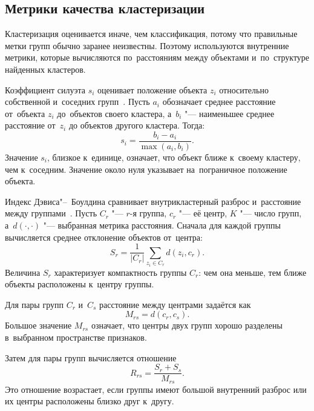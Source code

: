 \subsection{Метрики качества кластеризации}\label{subsec:ch1/cluster/metrics}

Кластеризация оценивается иначе, чем классификация, потому что правильные метки
групп обычно заранее неизвестны. Поэтому используются внутренние метрики,
которые вычисляются по~расстояниям между объектами и~по~структуре найденных
кластеров.

Коэффициент силуэта \( s_i \) оценивает положение объекта \( z_i \) относительно
собственной и~соседних групп~\autocite{Rousseeuw1987Silhouette}. Пусть
\( a_i \) обозначает среднее расстояние от~объекта \( z_i \) до~объектов своего
кластера, а~\( b_i \) "--- наименьшее среднее расстояние от~\( z_i \) до
объектов другого кластера. Тогда:
\begin{equation}
    \label{eq:silhouette}
    s_i = \frac{b_i - a_i}{\max(a_i,b_i)}.
\end{equation}
Значение \( s_i \), близкое к~единице, означает, что объект ближе к~своему
кластеру, чем к~соседним. Значение около нуля указывает на~пограничное
положение объекта.

Индекс Дэвиса"--~Боулдина сравнивает внутрикластерный разброс и~расстояние между
группами~\autocite{Davies1979DBI}. Пусть \( C_r \) "--- \( r \)-я группа,
\( c_r \) "--- её центр, \( K \) "--- число групп, а~\( d(\cdot,\cdot) \) "---
выбранная метрика расстояния. Сначала для каждой группы вычисляется среднее
отклонение объектов от~центра:
\begin{equation}
    \label{eq:davies-bouldin-scatter}
    S_r = \frac{1}{|C_r|}\sum_{z_i\in C_r} d(z_i,c_r).
\end{equation}
Величина \( S_r \) характеризует компактность группы \( C_r \): чем она меньше,
тем ближе объекты расположены к~центру группы.

Для пары групп \( C_r \) и~\( C_s \) расстояние между центрами задаётся как
\begin{equation}
    \label{eq:davies-bouldin-distance}
    M_{rs} = d(c_r,c_s).
\end{equation}
Большое значение \( M_{rs} \) означает, что центры двух групп хорошо разделены
в~выбранном пространстве признаков.

Затем для пары групп вычисляется отношение
\begin{equation}
    \label{eq:davies-bouldin-ratio}
    R_{rs} = \frac{S_r + S_s}{M_{rs}}.
\end{equation}
Это отношение возрастает, если группы имеют большой внутренний разброс или их
центры расположены близко друг к~другу.

